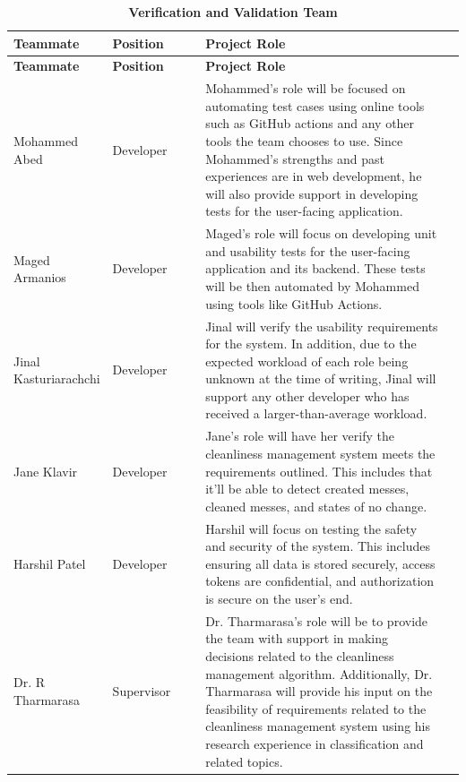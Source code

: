 \documentclass[12pt, titlepage]{article}
\begin{document}
\begin{longtable}{|>{\raggedright\arraybackslash}p{0.21\linewidth} | >{\raggedright\arraybackslash}p{0.21\linewidth} | >{\raggedright\arraybackslash}p{0.60\linewidth}| >{\raggedright\arraybackslash}p{0.21\linewidth}| }
    \caption{\bf Verification and Validation Team} \label{tab:my_label} \\
    
    \hline
    \textbf{Teammate} & \textbf{Position} & \textbf{Project Role}\\
    \hline
    \endfirsthead
    
    \hline
    \textbf{Teammate} & \textbf{Position} & \textbf{Project Role}\\
    \hline
    \endhead
    
    \hline
    \endfoot
    
    \hline
    \endlastfoot


    \hline
    Mohammed Abed & Developer & Mohammed's role will be focused on automating test cases using online tools such as GitHub actions and any other tools the team chooses to use. Since Mohammed's strengths and past experiences are in web development, he will also provide support in developing tests for the user-facing application. \\
   	\hline
    Maged Armanios & Developer & Maged's role will focus on developing unit and usability tests for the user-facing application and its backend. These tests will be then automated by Mohammed using tools like GitHub Actions. \\
    \hline
    Jinal Kasturiarachchi & Developer & Jinal will verify the usability requirements for the system. In addition, due to the expected workload of each role being unknown at the time of writing, Jinal will support any other developer who has received a larger-than-average workload. \\
    \hline
    Jane Klavir & Developer & Jane's role will have her verify the cleanliness management system meets the requirements outlined. This includes that it'll be able to detect created messes, cleaned messes, and states of no change. \\
    \hline
    Harshil Patel & Developer & Harshil will focus on testing the safety and security of the system. This includes ensuring all data is stored securely, access tokens are confidential, and authorization is secure on the user's end.  \\
	\hline
	Dr. R Tharmarasa & Supervisor & Dr. Tharmarasa's role will be to provide the team with support in making decisions related to the cleanliness management algorithm. Additionally, Dr. Tharmarasa will provide his input on the feasibility of requirements related to the cleanliness management system using his research experience in classification and related topics.
\end{longtable}
\end{document}

